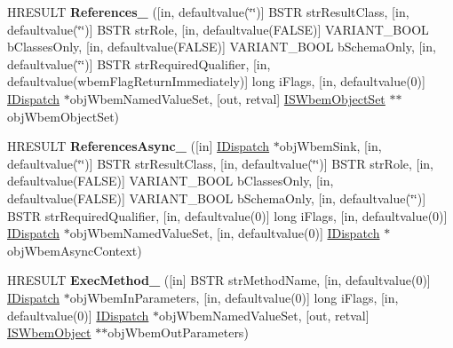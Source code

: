 \begin{DoxyCompactItemize}
\item 
\mbox{\label{interface_wbem_scripting_1_1_i_s_wbem_object_ac4cc249a952d733ef6dde683f48edc2d}} 
H\+R\+E\+S\+U\+LT {\bfseries References\+\_\+} (\mbox{[}in, defaultvalue(\char`\"{}\char`\"{})\mbox{]} B\+S\+TR str\+Result\+Class, \mbox{[}in, defaultvalue(\char`\"{}\char`\"{})\mbox{]} B\+S\+TR str\+Role, \mbox{[}in, defaultvalue(F\+A\+L\+SE)\mbox{]} V\+A\+R\+I\+A\+N\+T\+\_\+\+B\+O\+OL b\+Classes\+Only, \mbox{[}in, defaultvalue(F\+A\+L\+SE)\mbox{]} V\+A\+R\+I\+A\+N\+T\+\_\+\+B\+O\+OL b\+Schema\+Only, \mbox{[}in, defaultvalue(\char`\"{}\char`\"{})\mbox{]} B\+S\+TR str\+Required\+Qualifier, \mbox{[}in, defaultvalue(wbem\+Flag\+Return\+Immediately)\mbox{]} long i\+Flags, \mbox{[}in, defaultvalue(0)\mbox{]} \hyperlink{interface_i_dispatch}{I\+Dispatch} $\ast$obj\+Wbem\+Named\+Value\+Set, \mbox{[}out, retval\mbox{]} \hyperlink{interface_wbem_scripting_1_1_i_s_wbem_object_set}{I\+S\+Wbem\+Object\+Set} $\ast$$\ast$obj\+Wbem\+Object\+Set)
\item 
\mbox{\label{interface_wbem_scripting_1_1_i_s_wbem_object_a4e0c63058e7fbb476b26be962d6da2a8}} 
H\+R\+E\+S\+U\+LT {\bfseries References\+Async\+\_\+} (\mbox{[}in\mbox{]} \hyperlink{interface_i_dispatch}{I\+Dispatch} $\ast$obj\+Wbem\+Sink, \mbox{[}in, defaultvalue(\char`\"{}\char`\"{})\mbox{]} B\+S\+TR str\+Result\+Class, \mbox{[}in, defaultvalue(\char`\"{}\char`\"{})\mbox{]} B\+S\+TR str\+Role, \mbox{[}in, defaultvalue(F\+A\+L\+SE)\mbox{]} V\+A\+R\+I\+A\+N\+T\+\_\+\+B\+O\+OL b\+Classes\+Only, \mbox{[}in, defaultvalue(F\+A\+L\+SE)\mbox{]} V\+A\+R\+I\+A\+N\+T\+\_\+\+B\+O\+OL b\+Schema\+Only, \mbox{[}in, defaultvalue(\char`\"{}\char`\"{})\mbox{]} B\+S\+TR str\+Required\+Qualifier, \mbox{[}in, defaultvalue(0)\mbox{]} long i\+Flags, \mbox{[}in, defaultvalue(0)\mbox{]} \hyperlink{interface_i_dispatch}{I\+Dispatch} $\ast$obj\+Wbem\+Named\+Value\+Set, \mbox{[}in, defaultvalue(0)\mbox{]} \hyperlink{interface_i_dispatch}{I\+Dispatch} $\ast$obj\+Wbem\+Async\+Context)
\item 
\mbox{\label{interface_wbem_scripting_1_1_i_s_wbem_object_acfb787288dbb794303802a2849d8f7d6}} 
H\+R\+E\+S\+U\+LT {\bfseries Exec\+Method\+\_\+} (\mbox{[}in\mbox{]} B\+S\+TR str\+Method\+Name, \mbox{[}in, defaultvalue(0)\mbox{]} \hyperlink{interface_i_dispatch}{I\+Dispatch} $\ast$obj\+Wbem\+In\+Parameters, \mbox{[}in, defaultvalue(0)\mbox{]} long i\+Flags, \mbox{[}in, defaultvalue(0)\mbox{]} \hyperlink{interface_i_dispatch}{I\+Dispatch} $\ast$obj\+Wbem\+Named\+Value\+Set, \mbox{[}out, retval\mbox{]} \hyperlink{interface_wbem_scripting_1_1_i_s_wbem_object}{I\+S\+Wbem\+Object} $\ast$$\ast$obj\+Wbem\+Out\+Parameters)

\end{DoxyCompactItemize}
